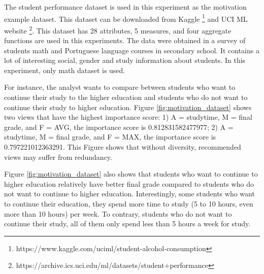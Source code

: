 \documentclass{article}
\begin{document}
The student performance dataset is used in this experiment as the motivation example dataset. This dataset can be downloaded from Kaggle \footnote{https://www.kaggle.com/uciml/student-alcohol-consumption} and UCI ML website \footnote{https://archive.ics.uci.edu/ml/datasets/student+performance}. This dataset has 28 attributes, 5 measures, and four aggregate functions are used in this experiments. The data were obtained in a survey of students math and Portuguese language courses in secondary school. It contains a lot of interesting social, gender and study information about students. In this experiment, only math dataset is used. 

For instance, the analyst wants to compare between students who want to continue their study to the higher education and students who do not want to continue their study to higher education. Figure \ref{fig:motivation_dataset} shows two views that have the highest importance score: 1) A = studytime, M = final grade, and F = AVG, the importance score is 0.812831582477977; 2) A = studytime, M = final grade, and F = MAX, the importance score is 0.797221012363291. This Figure shows that without diversity, recommended views may suffer from redundancy. 


Figure \ref{fig:motivation_dataset} also shows that students who want to continue to higher education relatively have better final grade compared to students who do not want to continue to higher education. Interestingly, some students who want to continue their education, they spend more time to study (5 to 10 hours, even more than 10 hours) per week. To contrary, students who do not want to continue their study, all of them only spend less than 5 hours a week for study.
\end{document}
